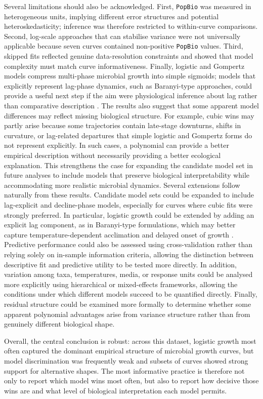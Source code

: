 \documentclass[11pt]{article}
\begin{document}
Several limitations should also be acknowledged. First, \texttt{PopBio} was measured in heterogeneous units, implying different error structures and potential heteroskedasticity; inference was therefore restricted to within-curve comparisons. Second, log-scale approaches that can stabilise variance were not universally applicable because seven curves contained non-positive \texttt{PopBio} values. Third, skipped fits reflected genuine data-resolution constraints and showed that model complexity must match curve informativeness. Finally, logistic and Gompertz models compress multi-phase microbial growth into simple sigmoids; models that explicitly represent lag-phase dynamics, such as Baranyi-type approaches, could provide a useful next step if the aim were physiological inference about lag rather than comparative description \citep{BaranyiRoberts1994,Buchanan1997}.
The results also suggest that some apparent model differences may reflect missing biological structure. For example, cubic wins may partly arise because some trajectories contain late-stage downturns, shifts in curvature, or lag-related departures that simple logistic and Gompertz forms do not represent explicitly. In such cases, a polynomial can provide a better empirical description without necessarily providing a better ecological explanation. This strengthens the case for expanding the candidate model set in future analyses to include models that preserve biological interpretability while accommodating more realistic microbial dynamics.
Several extensions follow naturally from these results. Candidate model sets could be expanded to include lag-explicit and decline-phase models, especially for curves where cubic fits were strongly preferred. In particular, logistic growth could be extended by adding an explicit lag component, as in Baranyi-type formulations, which may better capture temperature-dependent acclimation and delayed onset of growth \citep{BaranyiRoberts1994,Buchanan1997}. Predictive performance could also be assessed using cross-validation rather than relying solely on in-sample information criteria, allowing the distinction between descriptive fit and predictive utility to be tested more directly. In addition, variation among taxa, temperatures, media, or response units could be analysed more explicitly using hierarchical or mixed-effects frameworks, allowing the conditions under which different models succeed to be quantified directly. Finally, residual structure could be examined more formally to determine whether some apparent polynomial advantages arise from variance structure rather than from genuinely different biological shape.

Overall, the central conclusion is robust: across this dataset, logistic growth most often captured the dominant empirical structure of microbial growth curves, but model discrimination was frequently weak and subsets of curves showed strong support for alternative shapes. The most informative practice is therefore not only to report which model wins most often, but also to report how decisive those wins are and what level of biological interpretation each model permits.
\setlength{\bibhang}{0.3in}
\setlength{\bibsep}{0.1in}
\newpage


\end{document}
